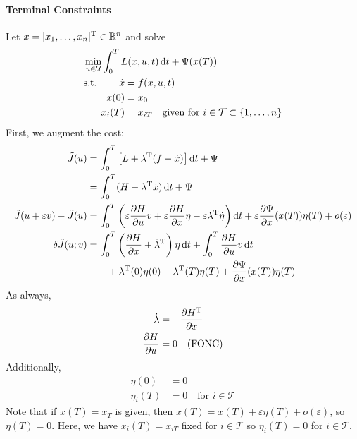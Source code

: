 \paragraph{Terminal Constraints} \mbox{}
\hypertarget{fixed_term_cons}{}

Let $x=[x_1,\dots,x_n]^\text{T}\in\mathbb{R}^n$ and solve
\begin{align}
  & \min_{u\in\mathcal U} \int_0^T L(x,u,t)\mathop{}\!\mathrm{d} t + \Psi(x(T)) \\
  & \text{s.t. } \begin{aligned}[t]
    \dot x &= f(x,u,t) \\
    x(0) &= x_0 \\
    x_i(T) &= x_{iT} \quad \text{given for } i\in\mathcal T \subset \{1,\dots,n\}
  \end{aligned}
\end{align}
First, we augment the cost:
\begin{align}
  \tilde J(u) &= \int_0^T \big[ L + \lambda^\text{T} (f-\dot x) \big] \mathop{}\!\mathrm{d} t + \Psi \\
              &= \int_0^T (H-\lambda^\text{T}\dot x) \mathop{}\!\mathrm{d} t + \Psi \\
  \tilde J (u+\varepsilon v) - \tilde J(u) &= \int_0^T \left( \varepsilon\frac{\partial H}{\partial u} v + \varepsilon\frac{\partial H}{\partial x}\eta - \varepsilon\lambda^\text{T}\dot\eta \right) \mathop{}\!\mathrm{d} t + \varepsilon\frac{\partial \Psi}{\partial x}(x(T))\eta(T) + o(\varepsilon) \\
  \delta\tilde J(u;v) &= \int_0^T \left( \frac{\partial H}{\partial x} + \dot\lambda^\text{T} \right)\eta\mathop{}\!\mathrm{d} t + \int_0^T \frac{\partial H}{\partial u}v\mathop{}\!\mathrm{d} t \\
              & \qquad + \lambda^\text{T}(0)\eta(0) - \lambda^\text{T}(T)\eta(T) + \frac{\partial \Psi}{\partial x}(x(T))\eta(T)
\end{align}
As always,
\begin{align}
  \dot\lambda &= -\frac{\partial H^\text{T}}{\partial x} \\
  \frac{\partial H}{\partial u} &= 0 \quad \text{(FONC)}
\end{align}
Additionally,
\begin{align}
  \eta(0) &= 0 \\
  \eta_i(T) &= 0 \quad \text{for } i\in\mathcal T
\end{align}
Note that if $x(T)=x_T$ is given, then $x(T)=x(T)+\varepsilon\eta(T)+o(\varepsilon)$, so $\eta(T)=0$. Here, we have $x_i(T)=x_{iT}$ fixed for $i\in\mathcal T$ so $\eta_i(T)=0$ for $i\in\mathcal T$.

